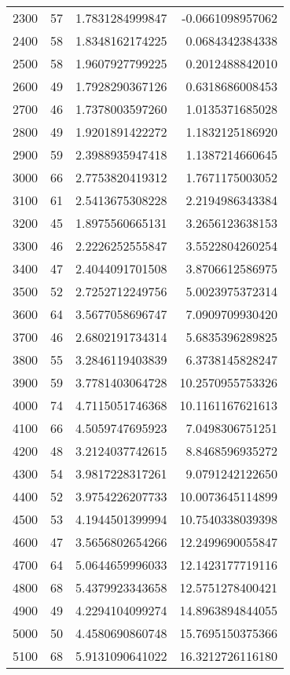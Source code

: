 \begin{longtable}{lrrr}
2300 & 57 & 1.7831284999847 & -0.0661098957062 \\
2400 & 58 & 1.8348162174225 & 0.0684342384338 \\
2500 & 58 & 1.9607927799225 & 0.2012488842010 \\
2600 & 49 & 1.7928290367126 & 0.6318686008453 \\
2700 & 46 & 1.7378003597260 & 1.0135371685028 \\
2800 & 49 & 1.9201891422272 & 1.1832125186920 \\
2900 & 59 & 2.3988935947418 & 1.1387214660645 \\
3000 & 66 & 2.7753820419312 & 1.7671175003052 \\
3100 & 61 & 2.5413675308228 & 2.2194986343384 \\
3200 & 45 & 1.8975560665131 & 3.2656123638153 \\
3300 & 46 & 2.2226252555847 & 3.5522804260254 \\
3400 & 47 & 2.4044091701508 & 3.8706612586975 \\
3500 & 52 & 2.7252712249756 & 5.0023975372314 \\
3600 & 64 & 3.5677058696747 & 7.0909709930420 \\
3700 & 46 & 2.6802191734314 & 5.6835396289825 \\
3800 & 55 & 3.2846119403839 & 6.3738145828247 \\
3900 & 59 & 3.7781403064728 & 10.2570955753326 \\
4000 & 74 & 4.7115051746368 & 10.1161167621613 \\
4100 & 66 & 4.5059747695923 & 7.0498306751251 \\
4200 & 48 & 3.2124037742615 & 8.8468596935272 \\
4300 & 54 & 3.9817228317261 & 9.0791242122650 \\
4400 & 52 & 3.9754226207733 & 10.0073645114899 \\
4500 & 53 & 4.1944501399994 & 10.7540338039398 \\
4600 & 47 & 3.5656802654266 & 12.2499690055847 \\
4700 & 64 & 5.0644659996033 & 12.1423177719116 \\
4800 & 68 & 5.4379923343658 & 12.5751278400421 \\
4900 & 49 & 4.2294104099274 & 14.8963894844055 \\
5000 & 50 & 4.4580690860748 & 15.7695150375366 \\
5100 & 68 & 5.9131090641022 & 16.3212726116180 \\
\end{longtable}
